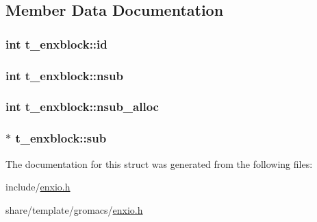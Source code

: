 \subsection{\-Member \-Data \-Documentation}
\hypertarget{structt__enxblock_adff25f8b2ea48bec620bbb19e90fa8e3}{
\subsubsection[{id}]{\setlength{\rightskip}{0pt plus 5cm}int {\bf t\-\_\-enxblock\-::id}}}\label{structt__enxblock_adff25f8b2ea48bec620bbb19e90fa8e3}
\hypertarget{structt__enxblock_acbd759e02f7b519df4af7d64df6debbb}{
\subsubsection[{nsub}]{\setlength{\rightskip}{0pt plus 5cm}int {\bf t\-\_\-enxblock\-::nsub}}}\label{structt__enxblock_acbd759e02f7b519df4af7d64df6debbb}
\hypertarget{structt__enxblock_a155a35dc626554195798243ee01df3bb}{
\subsubsection[{nsub\-\_\-alloc}]{\setlength{\rightskip}{0pt plus 5cm}int {\bf t\-\_\-enxblock\-::nsub\-\_\-alloc}}}\label{structt__enxblock_a155a35dc626554195798243ee01df3bb}
\hypertarget{structt__enxblock_aae8941ff913b3f0b9ba18650d3f51b23}{
\subsubsection[{sub}]{ $\ast$ {\bf t\-\_\-enxblock\-::sub}}}\label{structt__enxblock_aae8941ff913b3f0b9ba18650d3f51b23}


\-The documentation for this struct was generated from the following files\-:\begin{DoxyCompactItemize}
\item 
include/\hyperlink{include_2enxio_8h}{enxio.\-h}\item 
share/template/gromacs/\hyperlink{share_2template_2gromacs_2enxio_8h}{enxio.\-h}\end{DoxyCompactItemize}
